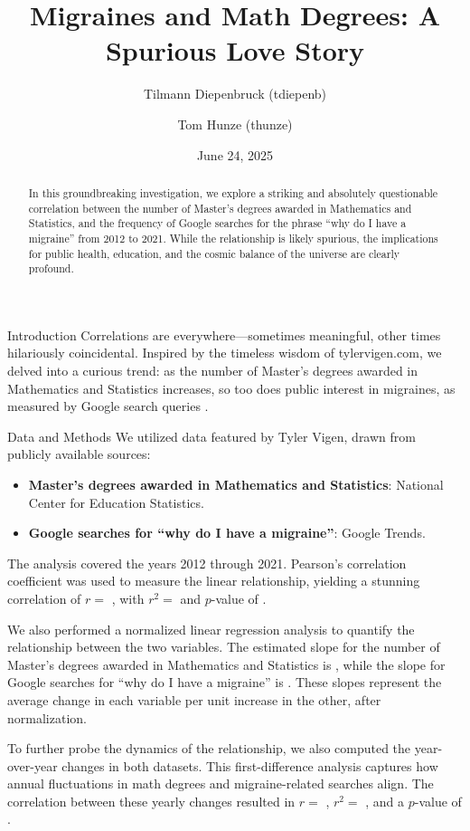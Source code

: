 \documentclass{article}
\title{\textbf{Migraines and Math Degrees: A Spurious Love Story}}
\author{Tilmann Diepenbruck (tdiepenb) \and Tom Hunze (thunze)}
\date{June 24, 2025}
\newcommand\minput[1]{%
  \ifhmode\ifnum\lastnodetype=11 \unskip\fi\fi}
\begin{document}
\maketitle

\begin{abstract}
  In this groundbreaking investigation, we explore a striking and absolutely questionable correlation between the number of Master's degrees awarded in Mathematics and Statistics, and the frequency of Google searches for the phrase ``why do I have a migraine'' from 2012 to 2021. While the relationship is likely spurious, the implications for public health, education, and the cosmic balance of the universe are clearly profound.
\end{abstract}

\begin{section}{Introduction}
 Correlations are everywhere---sometimes meaningful, other times hilariously coincidental. Inspired by the timeless wisdom of tylervigen.com, we delved into a curious trend: as the number of Master's degrees awarded in Mathematics and Statistics increases, so too does public interest in migraines, as measured by Google search queries \cite{vigen}.
\end{section}

\begin{section}{Data and Methods}
 We utilized data featured by Tyler Vigen, drawn from publicly available sources:
 \begin{itemize}
   \item \textbf{Master's degrees awarded in Mathematics and Statistics}: National Center for Education Statistics. \cite{nc_es}
   \item \textbf{Google searches for ``why do I have a migraine''}: Google Trends. \cite{google_trends}
 \end{itemize}
 The analysis covered the years 2012 through 2021. Pearson's correlation coefficient was used to measure the linear relationship, yielding a stunning correlation of $r =$ \minput{generated/correlation_value.tex}, with $r^2 =$ \minput{generated/r_squared_value.tex} and $p$-value of \minput{generated/p_value.tex}.

 We also performed a normalized linear regression analysis to quantify the relationship between the two variables. The estimated slope for the number of Master's degrees awarded in Mathematics and Statistics is \minput{generated/nces_slope_value.tex}, while the slope for Google searches for ``why do I have a migraine'' is \minput{generated/google_slope_value.tex}. These slopes represent the average change in each variable per unit increase in the other, after normalization.

 To further probe the dynamics of the relationship, we also computed the year-over-year changes in both datasets. This first-difference analysis captures how annual fluctuations in math degrees and migraine-related searches align. The correlation between these yearly changes resulted in $r =$ \minput{generated/yearly_changes_correlation_value.tex}, $r^2 =$ \minput{generated/yearly_changes_r_squared_value.tex}, and a $p$-value of \minput{generated/yearly_changes_p_value.tex}.
\end{section}
\end{document}
